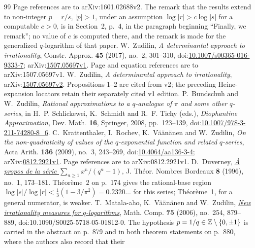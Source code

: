 \documentclass[11pt]{article}
\begin{document}
\begin{thebibliography}{99}
  Page references are to arXiv:1601.02688v2.
  The remark that the results extend to non-integer \(p=r/s\), \(|p|>1\), under
  an assumption \(\log|r|>c\log|s|\) for a computable \(c>0\), is in Section~2,
  p.~4, in the paragraph beginning ``Finally, we remark''; no value of \(c\) is
  computed there, and the remark is made for the generalized \(q\)-logarithm of
  that paper.
 W.~Zudilin, \emph{A determinantal approach to
  irrationality}, Constr. Approx. \textbf{45} (2017), no.~2, 301--310,
  doi:\href{https://doi.org/10.1007/s00365-016-9333-7}{10.1007/s00365-016-9333-7};
  arXiv:\href{https://arxiv.org/abs/1507.05697v1}{1507.05697v1}.
  Page and equation references are to arXiv:1507.05697v1.
 W.~Zudilin, \emph{A determinantal approach to
  irrationality}, arXiv:\href{https://arxiv.org/abs/1507.05697v2}{1507.05697v2}.
  Propositions 1--2 are cited from v2; the preceding Heine-expansion
  locators retain their separately cited v1 edition.
 P.~Bundschuh and W.~Zudilin, \emph{Rational
  approximations to a \(q\)-analogue of \(\pi\) and some other \(q\)-series},
  in H.~P. Schlickewei, K.~Schmidt and R.~F. Tichy (eds.), \emph{Diophantine
  Approximation}, Dev. Math. \textbf{16}, Springer, 2008, pp.~123--139,
  doi:\href{https://doi.org/10.1007/978-3-211-74280-8_6}{10.1007/978-3-211-74280-8\_6}.
 C.~Krattenthaler, I.~Rochev, K.~V\"a\"an\"anen and
  W.~Zudilin, \emph{On the non-quadraticity of values of the
  \(q\)-exponential function and related \(q\)-series}, Acta Arith.
  \textbf{136} (2009), no.~3, 243--269,
  doi:\href{https://doi.org/10.4064/aa136-3-4}{10.4064/aa136-3-4};
  arXiv:\href{https://arxiv.org/abs/0812.2921v1}{0812.2921v1}.
  Page references are to arXiv:0812.2921v1.
 D.~Duverney,
  \href{https://numdam.org/item/JTNB_1996__8_1_173_0.pdf}{\emph{\`A propos de la
  s\'erie $\sum_{n\ge1}x^{n}/(q^{n}-1)$}},
  J. Th\'eor. Nombres Bordeaux \textbf{8} (1996), no.~1, 173--181.
  Th\'eor\`eme~2 on p.~174 gives the rational-base region
  $\log|s|/\log|r|<\frac13(1-3/\pi^{2})=0.2320\ldots$ for this series;
  Th\'eor\`eme~1, for a general numerator, is weaker.
 T.~Matala-aho, K.~V\"a\"an\"anen and W.~Zudilin,
  \href{https://doi.org/10.1090/S0025-5718-05-01812-0}{\emph{New irrationality
  measures for \(q\)-logarithms}}, Math. Comp. \textbf{75} (2006), no.~254,
  879--889, doi:10.1090/S0025-5718-05-01812-0.  The hypothesis
  \(p=1/q\in\mathbb{Z}\mathbin{\backslash}\{0,\pm1\}\) is carried in the abstract on p.~879 and in
  both theorem statements on p.~880, where the authors also record that their

\end{thebibliography}
\end{document}

